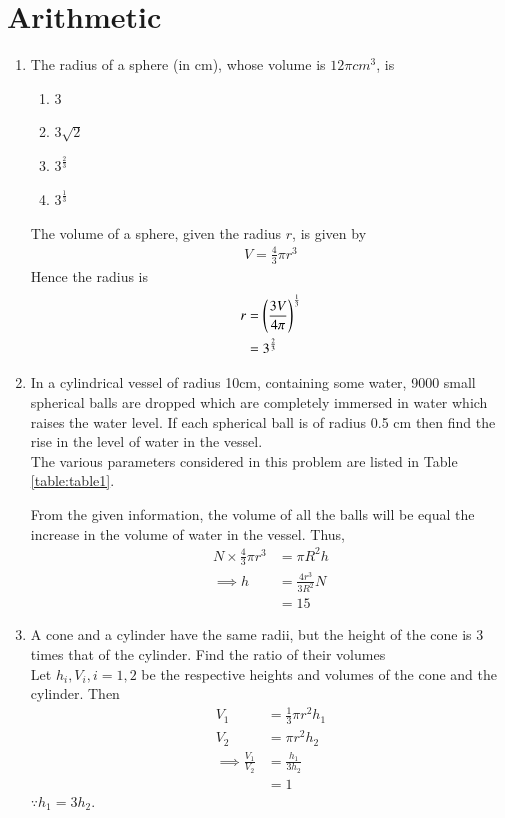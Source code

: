 \documentclass[journal,12pt,twocolumn]{IEEEtran}
\renewcommand\thesection{\arabic{section}}
\begin{document}
\section{Arithmetic}
\begin{enumerate}[label=\thesection.\arabic*.,ref=\thesection.\theenumi]
\item The radius of a sphere (in cm), whose volume is $12\pi cm^3$, is
\begin{enumerate}
    \item $3$
    \item $3 \sqrt{2}$
    \item $3^\frac{2}{3}$
    \item $3^\frac{1}{3}$
\end{enumerate}
\solution 
The volume of a sphere, given the radius $r$, is given by
\begin{align}
	V = \frac{4}{3}\pi r^3
\end{align}
Hence the radius is 
\begin{align}
	r &= \left(\frac{3V}{4\pi}\right)^{\frac{1}{3}}  
	\\
	 &= 3^{\frac{2}{3}}  
\end{align}

    \item In a cylindrical vessel of radius 10cm, containing some water, 9000 small spherical balls are dropped which are completely immersed in water which raises the water level. If each spherical ball is of radius 0.5 cm then find the rise in the level of water in the vessel.\\
	    \solution The various parameters considered in this problem are listed in Table 
\eqref{table:table1}. 

\begin{table}[ht!]
	
\caption{}
\label{table:table1}	
\end{table}
From the given information, the volume of all the balls will be equal the increase in the volume of water in the vessel.  Thus, 
\begin{align}
	N \times \frac{4}{3}\pi r^3 &= \pi R^2 h
	\\
	\implies  h &=  \frac{4r^3}{3R^2}N
	\\
	&= 15
\end{align}
    \item A cone and a cylinder have the same radii, but the height of the cone is 3 times that of the cylinder. Find the ratio of their volumes\\
   \solution Let $h_i, V_i, i = 1,2$ be the respective heights and volumes of the cone and the cylinder. 
   Then 
  \begin{align}
	  V_1 &= \frac{1}{3} \pi r^2 h_1
	  \\
	  V_2 &=  \pi r^2 h_2
	  \\
	  \implies \frac{V_1}{V_2} &= \frac{h_1}{3h_2}
	  \\
	  &= 1
  \end{align}
  $\because h_1 = 3h_2$.

\end{enumerate}
\end{document}

